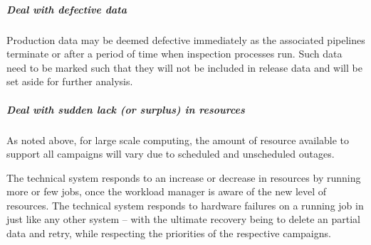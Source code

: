 \subparagraph{Deal with defective data}
Production data may be deemed defective immediately as the associated pipelines
terminate or after a period of time when inspection processes run. Such data need
to be marked such that they will not be included in release data and will be set aside
for further analysis.

\subparagraph{Deal with sudden lack (or surplus) in resources}
As noted above, for large scale computing, the amount of resource available to
support all campaigns will vary due to scheduled and unscheduled outages.

The technical system responds to an increase or decrease in resources by running
more or few jobs, once the workload manager is aware of the new level of
resources. The technical system responds to hardware failures on a running job
in just like any other system -- with the ultimate recovery being to  delete an
partial data and retry, while respecting the priorities of the respective campaigns.
